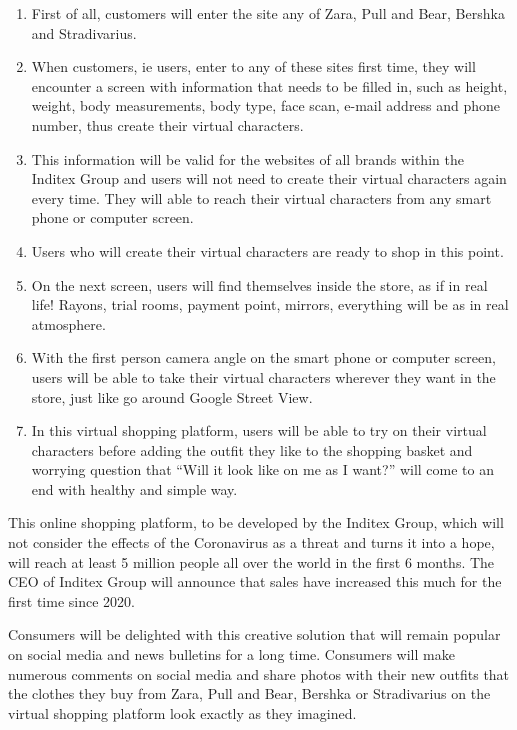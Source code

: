 \documentclass[]{book}
\begin{document}
\begin{enumerate}
\def\labelenumi{\arabic{enumi}.}
\item
  First of all, customers will enter the site any of Zara, Pull and Bear, Bershka and Stradivarius.
\item
  When customers, ie users, enter to any of these sites first time, they will encounter a screen with information that needs to be filled in, such as height, weight, body measurements, body type, face scan, e-mail address and phone number, thus create their virtual characters.
\item
  This information will be valid for the websites of all brands within the Inditex Group and users will not need to create their virtual characters again every time. They will able to reach their virtual characters from any smart phone or computer screen.
\item
  Users who will create their virtual characters are ready to shop in this point.
\item
  On the next screen, users will find themselves inside the store, as if in real life! Rayons, trial rooms, payment point, mirrors, everything will be as in real atmosphere.
\item
  With the first person camera angle on the smart phone or computer screen, users will be able to take their virtual characters wherever they want in the store, just like go around Google Street View.
\item
  In this virtual shopping platform, users will be able to try on their virtual characters before adding the outfit they like to the shopping basket and worrying question that ``Will it look like on me as I want?'' will come to an end with healthy and simple way.
\end{enumerate}

This online shopping platform, to be developed by the Inditex Group, which will not consider the effects of the Coronavirus as a threat and turns it into a hope, will reach at least 5 million people all over the world in the first 6 months. The CEO of Inditex Group will announce that sales have increased this much for the first time since 2020.

Consumers will be delighted with this creative solution that will remain popular on social media and news bulletins for a long time. Consumers will make numerous comments on social media and share photos with their new outfits that the clothes they buy from Zara, Pull and Bear, Bershka or Stradivarius on the virtual shopping platform look exactly as they imagined.
\end{document}
